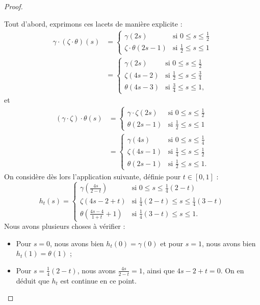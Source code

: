 \begin{proof}
\begin{enumerate}
    Tout d'abord, exprimons ces lacets de manière explicite : \[\begin{split}
    \gamma\cdot(\zeta\cdot\theta)(s)&=\left\{\begin{matrix}
        \gamma(2s)&\text{si }0\leq s\leq\frac{1}{2}\\
        \zeta\cdot\theta(2s-1)&\text{si }\frac{1}{2}\leq s\leq 1
    \end{matrix}\right.\\
    &=\left\{\begin{matrix}
        \gamma(2s)&\text{si }0\leq s\leq\frac{1}{2}\\
        \zeta(4s-2)&\text{si }\frac{1}{2}\leq s\leq\frac{3}{4}\\
        \theta(4s-3)&\text{si }\frac{3}{4}\leq s\leq1,
    \end{matrix}\right.
    \end{split}\]et\[\begin{split}
    (\gamma\cdot\zeta)\cdot\theta(s)&=\left\{\begin{matrix}
        \gamma\cdot\zeta(2s)&\text{si }0\leq s\leq\frac{1}{2}\\
        \theta(2s-1)&\text{si }\frac{1}{2}\leq s\leq 1
    \end{matrix}\right.\\
    &=\left\{\begin{matrix}
        \gamma(4s)&\text{si }0\leq s\leq\frac{1}{4}\\
        \zeta(4s-1)&\text{si }\frac{1}{4}\leq s\leq\frac{1}{2}\\
        \theta(2s-1)&\text{si }\frac{1}{2}\leq s\leq1.
    \end{matrix}\right.
    \end{split}\]On considère dès lors l'application suivante, définie pour $t\in[0,1]$ : \[h_t(s)=\left\{\begin{matrix}
    \gamma\left(\frac{4s}{2-t}\right)&\text{si }0\leq s\leq \frac{1}{4}(2-t)\\
    \zeta\left(4s-2+t\right)&\text{si }\frac{1}{4}(2-t)\leq s\leq \frac{1}{4}(3-t)\\
    \theta\left(\frac{4s-4}{1+t}+1\right)&\text{si }\frac{1}{4}(3-t)\leq s\leq1.
    \end{matrix}\right.\]Nous avons plusieurs choses à vérifier : \begin{itemize}
        \item Pour $s=0$, nous avons bien $h_t(0)=\gamma(0)$ et pour $s=1$, nous avons bien $h_t(1)=\theta(1)$ ;
        \item Pour $s=\frac{1}{4}(2-t)$, nous avons $\frac{4s}{2-t}=1$, ainsi que $4s-2+t=0$. On en déduit que $h_t$ est continue en ce point.

\end{itemize}
\end{enumerate}
\end{proof}
